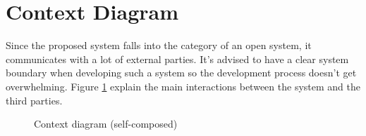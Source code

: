 \section{Context Diagram}

Since the proposed system falls into the category of an open system, it communicates with a lot of external parties. It's advised to have a clear system boundary when developing such a system so the development process doesn't get overwhelming. Figure \ref{fig:context-digram} explain the main interactions between the system and the third parties.

\begin{figure}[H]
    \setlength{\fboxsep}{10pt}
    \caption{Context diagram (self-composed)}
    \label{fig:context-digram}
\end{figure}
